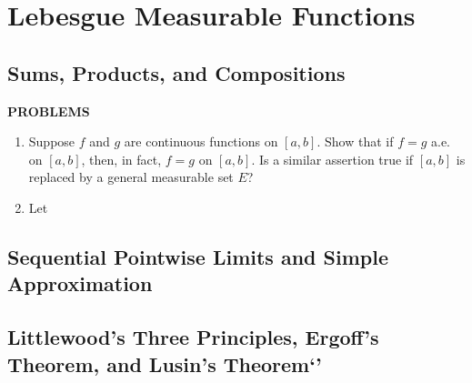 \chapter{Lebesgue Measurable Functions}

\section{Sums, Products, and Compositions}
\begin{center}
	\textbf{PROBLEMS}
\end{center}
\begin{enumerate}
	\setcounter{enumi}{0}
	\item Suppose $f$ and $g$ are continuous functions on $[a,b]$. Show that if $f=g$ a.e. on $[a,b]$, then, in fact, $f=g$ on $[a,b]$.
    Is a similar assertion true if $[a,b]$ is replaced by a general measurable set $E$?
    \item Let
\end{enumerate}

\section{Sequential Pointwise Limits and Simple Approximation}

\section{Littlewood's Three Principles, Ergoff's Theorem, and Lusin's Theorem`'}

